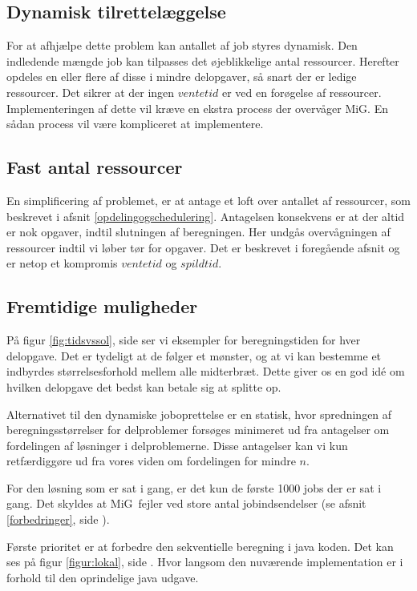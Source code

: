 \documentclass[final,a4paper,11pt]{article}
\newcommand{\mig}{MiG}
\begin{document}
\subsection{Dynamisk tilrettelæggelse}

For at afhjælpe dette problem kan antallet af job styres dynamisk. Den indledende mængde job kan tilpasses det øjeblikkelige antal ressourcer. Herefter opdeles en eller flere af disse i mindre delopgaver, så snart der er ledige ressourcer.  Det sikrer at der ingen $ventetid$ er ved en forøgelse af ressourcer. Implementeringen af dette vil kræve en ekstra process der overvåger \mig. En sådan process vil være kompliceret at implementere.

\subsection{Fast antal ressourcer}

En simplificering af problemet, er at antage et loft over antallet af ressourcer, som beskrevet i afsnit \ref{opdelingogschedulering}. Antagelsen konsekvens er at der altid er nok opgaver, indtil slutningen af beregningen.  Her undgås overvågningen af ressourcer indtil vi løber tør for opgaver. Det er beskrevet i foregående afsnit og er netop et kompromis $ventetid$ og $spildtid$.

\subsection{Fremtidige muligheder}

På figur \ref{fig:tidsvssol}, side \pageref{fig:tidsvssol} ser vi eksempler for beregningstiden for hver delopgave. Det er tydeligt at de følger et mønster, og at vi kan bestemme et indbyrdes størrelsesforhold mellem alle midterbræt. Dette giver os en god idé om hvilken delopgave det bedst kan betale sig at splitte op.

Alternativet til den dynamiske joboprettelse er en statisk, hvor spredningen af beregningsstørrelser for delproblemer forsøges minimeret ud fra antagelser om fordelingen af løsninger i delproblemerne. Disse antagelser kan vi kun retfærdiggøre ud fra vores viden om fordelingen for mindre $n$. 

For den løsning som er sat i gang, er det kun de første 1000 jobs der er sat i gang. Det skyldes at \mig\  fejler ved store antal jobindsendelser (se afsnit \ref{forbedringer}, side \pageref{forbedringer}). 

Første prioritet er at forbedre den sekventielle beregning i java koden. Det kan ses på figur \ref{figur:lokal}, side \pageref{figur:lokal}. Hvor langsom den nuværende implementation er i forhold til den oprindelige java udgave.
   
\end{document}
